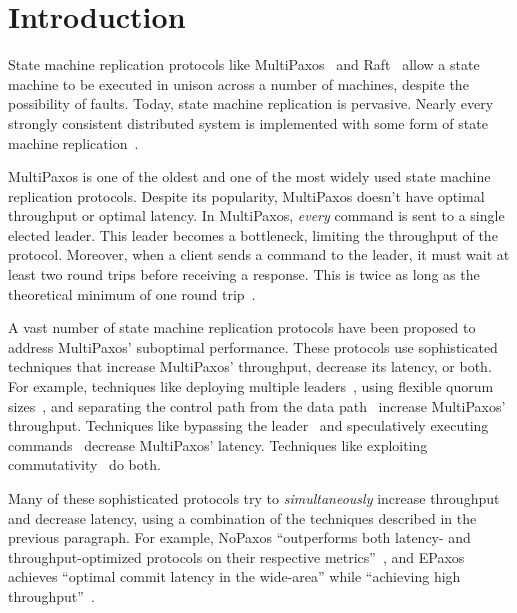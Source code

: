 \section{Introduction}
State machine replication protocols like MultiPaxos~\cite{lamport1998part,
lamport2001paxos} and Raft~\cite{ongaro2014search} allow a state machine to be
executed in unison across a number of machines, despite the possibility of
faults. Today, state machine replication is pervasive. Nearly every strongly
consistent distributed system is implemented with some form of state machine
replication~\cite{corbett2013spanner, thomson2012calvin, hunt2010zookeeper,
burrows2006chubby, baker2011megastore, cockroach2019website, cosmos2019website,
tidb2019website, yugabyte2019website}.

MultiPaxos is one of the oldest and one of the most widely used state machine
replication protocols. Despite its popularity, MultiPaxos doesn't have optimal
throughput or optimal latency. In MultiPaxos, \emph{every} command is sent to a
single elected leader. This leader becomes a bottleneck, limiting the
throughput of the protocol. Moreover, when a client sends a command to the
leader, it must wait at least two round trips before receiving a response. This
is twice as long as the theoretical minimum of one round
trip~\cite{lamport2006lower}.

A vast number of state machine replication protocols have been proposed to
address MultiPaxos' suboptimal performance. These protocols use sophisticated
techniques that increase MultiPaxos' throughput, decrease its latency,
or both. For example, techniques like
  deploying multiple leaders~\cite{mao2008mencius, moraru2013there,
  arun2017speeding},
  using flexible quorum sizes~\cite{howard2016flexible, nawab2018dpaxos}, and
  separating the control path from the data path~\cite{biely2012s}
increase MultiPaxos' throughput. Techniques like
  bypassing the leader~\cite{lamport2006fast, ports2015designing, li2016just}
  and
  speculatively executing commands~\cite{ports2015designing, li2016just,
  park2019exploiting}
decrease MultiPaxos' latency. Techniques like
  exploiting commutativity~\cite{lamport2005generalized, moraru2013there,
  arun2017speeding, park2019exploiting}
do both.

Many of these sophisticated protocols try to \emph{simultaneously} increase
throughput and decrease latency, using a combination of the techniques
described in the previous paragraph. For example, NoPaxos ``outperforms both
latency- and throughput-optimized protocols on their respective
metrics''~\cite{li2016just}, and EPaxos achieves ``optimal commit latency
in the wide-area'' while ``achieving high throughput''~\cite{moraru2013there}.

